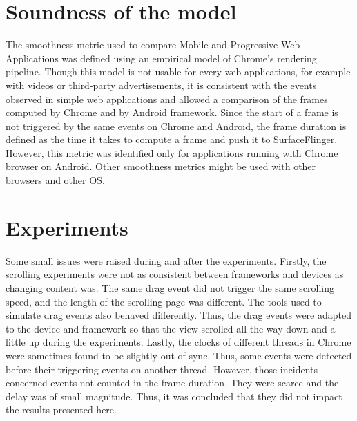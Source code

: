 \documentclass{kththesis}
\begin{document}
\section{Soundness of the model}
The smoothness metric used to compare Mobile and Progressive Web Applications was defined using an empirical model of Chrome's rendering pipeline. Though this model is not usable for every web applications, for example with videos or third-party advertisements, it is consistent with the events observed in simple web applications and allowed a comparison of the frames computed by Chrome and by Android framework. Since the start of a frame is not triggered by the same events on Chrome and Android, the frame duration is defined as the time it takes to compute a frame and push it to SurfaceFlinger. However, this metric was identified only for applications running with Chrome browser on Android. Other smoothness metrics might be used with other browsers and other OS. 

\section{Experiments}
Some small issues were raised during and after the experiments.\newline
Firstly, the scrolling experiments were not as consistent between frameworks and devices as changing content was. The same drag event did not trigger the same scrolling speed, and the length of the scrolling page was different. The tools used to simulate drag events also behaved  differently. Thus, the drag events were adapted to the device and framework so that the view scrolled all the way down and a little up during the experiments. \newline
Lastly, the clocks of different threads in Chrome were sometimes found to be slightly out of sync. Thus, some events were detected before their triggering events on another thread. However, those incidents concerned events not counted in the frame duration. They were scarce and the delay was of small magnitude. Thus, it was concluded that they did not impact the results presented here.
\end{document}
